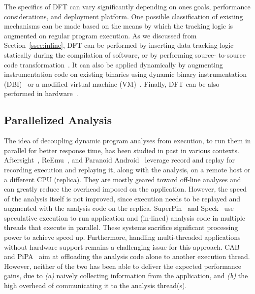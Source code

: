 The specifics of DFT can vary significantly depending on ones goals,
performance considerations, and deployment platform. One possible
classification of existing mechanisms can be made based on the means by which
the tracking logic is augmented on regular program execution. As we discussed
from Section~\ref{ssec:inline}, DFT can be performed by inserting data tracking
logic statically during the compilation of software, or by performing source-
to-source code transformation~\cite{txl, cil}. It can also be applied
dynamically by augmenting instrumentation code on existing binaries using
dynamic binary instrumentation (DBI)~\cite{pin:pldi2005, valgrind, dynamorio}
or a modified virtual machine (VM)~\cite{qemu:usenix05, xen:sosp2003}.
Finally, DFT can be also performed in hardware~\cite{raksha:isca2007,
lba:isca2008}.

\subsection{Parallelized Analysis}
\label{ssec:parallel}

The idea of decoupling dynamic program analyses from execution, to run them in
parallel for better response time, has been studied in past in various
contexts. 
%
Aftersight~\cite{aftersight:atc2008}, ReEmu~\cite{reemu:ppopp2013}, and
Paranoid Android~\cite{paranoidandroid:acsac10} leverage record and replay for
recording execution and replaying it, along with the analysis, on a remote host
or a different CPU (replica). They are mostly geared toward off-line analyses
and can greatly reduce the overhead imposed on the application.  However, the
speed of the analysis itself is not improved, since execution needs to be
replayed and augmented with the analysis code on the replica.
SuperPin~\cite{superpin:cgo2007} and Speck~\cite{speck:asplos2008} use
speculative execution to run application and (in-lined) analysis code in
multiple threads that execute in parallel.  These systems sacrifice significant
processing power to achieve speed up.  Furthermore, handling multi-threaded
applications without hardware support remains a challenging issue for this
approach. CAB~\cite{cab:oopsala2009} and PiPA~\cite{pipa:cgo2008} aim at
offloading the analysis code alone to another execution thread. However,
neither of the two has been able to deliver the expected performance gains, due
to {\it (a)} naively collecting information from the application, and {\it (b)}
the high overhead of communicating it to the analysis thread(s). 

